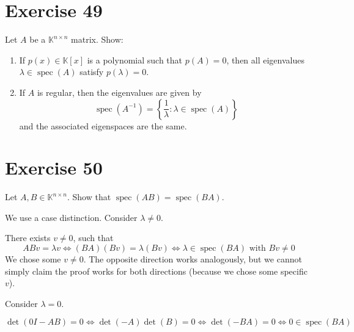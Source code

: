 \documentclass[a4paper]{article}
\theoremstyle{definition}
\newcommand\set[1]{\left\{#1\right\}}
\begin{document}
\section{Exercise 49}
\begin{ex}
  Let $A$ be a $\mathbb K^{n\times n}$ matrix. Show:
  \begin{enumerate}
    \item If $p(x) \in \mathbb K[x]$ is a polynomial such that $p(A) = 0$, then all eigenvalues $\lambda \in \operatorname{spec}(A)$ satisfy $p(\lambda) = 0$.
    \item If $A$ is regular, then the eigenvalues are given by
      \[ \operatorname{spec}(A^{-1}) = \set{\frac1{\lambda} : \lambda \in \operatorname{spec}(A)} \]
      and the associated eigenspaces are the same.
  \end{enumerate}
\end{ex}

\section{Exercise 50}
\begin{ex}
  Let $A, B \in \mathbb K^{n \times n}$. Show that $\operatorname{spec}(AB) = \operatorname{spec}(BA)$.
\end{ex}

We use a case distinction. Consider $\lambda \neq 0$.

There exists $v \neq 0$, such that
\[ AB v = \lambda v \iff (BA)(Bv) = \lambda (Bv) \iff \lambda \in \operatorname{spec}(BA) \text{ with } Bv \neq 0 \]
We chose some $v \neq 0$. The opposite direction works analogously, but we cannot simply claim the proof works for both directions (because we chose some specific $v$).

Consider $\lambda = 0$.

\[ \det(0I - AB) = 0 \iff \det(-A) \det(B) = 0 \iff \det(-BA) = 0 \iff 0 \in \operatorname{spec}(BA) \]
\end{document}

